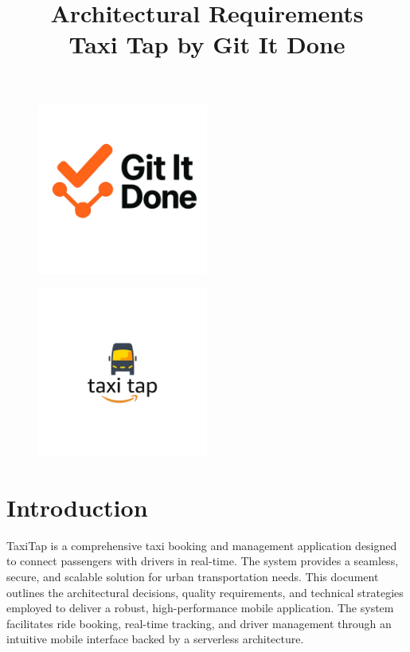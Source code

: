 \documentclass[12pt]{article}
\title{Architectural Requirements\\Taxi Tap by Git It Done}
\date{}
\begin{document}
\maketitle

\begin{figure}[H]
  \centering
  \includegraphics[width=0.5\textwidth]{LogoGroup.png} 
\end{figure}

\begin{figure}[H]
  \centering
  \includegraphics[width=0.5\textwidth]{LogoTaxiTap.png} 
\end{figure}

\newpage

\tableofcontents
\newpage

\section{Introduction}

TaxiTap is a comprehensive taxi booking and management application designed to connect passengers with drivers in real-time. The system provides a seamless, secure, and scalable solution for urban transportation needs. This document outlines the architectural decisions, quality requirements, and technical strategies employed to deliver a robust, high-performance mobile application.
The system facilitates ride booking, real-time tracking, and driver management through an intuitive mobile interface backed by a serverless architecture.
\end{document}
